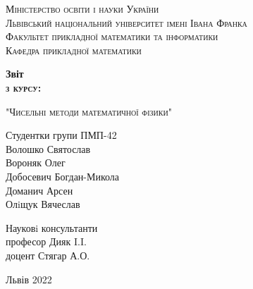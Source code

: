 \documentclass[12pt,a4paper, twoside]{article}
\begin{document}
\begin{titlepage}
 \begin{center}
 {\scshape Міністерство освіти і науки України \\
 Львівський національний університет імені Івана Франка \\
  \vspace{0.5cm}
 Факультет прикладної математики та інформатики \\
 Кафедра прикладної математики
  \par}
  \vspace{4cm}
 {\Large \bfseries Звіт\\
 \scshape з курсу:
 \par }
 \vspace{0.5cm}
 {\scshape\Large "Чисельні методи математичної фізики"\\}
 \vspace{1.5cm}
 \vspace{2cm}
 \end{center}
 \vfill

\begin{flushright}  
Студентки групи ПМП-42 \\
Волошко Святослав\\
Вороняк Олег\\
Добосевич Богдан-Микола\\
Доманич Арсен\\
Олiщук Вячеслав\\ 
\end{flushright} 
\begin{flushright} 
Науковi консультанти\\
професор Дияк I.I.\\доцент Стягар А.О.
\end{flushright} 
\vspace{2cm}
\begin{center}
 {\small  Львів 2022 \par}
\end{center}
\end{titlepage}

\tableofcontents

\clearpage
{}
\end{document}
